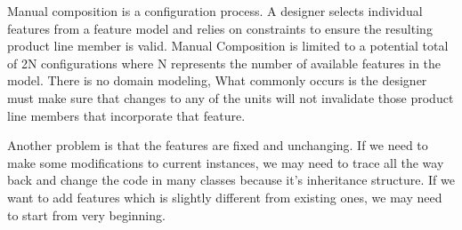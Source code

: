 Manual composition is a configuration process. A designer selects
individual features from a feature model and relies on constraints to
ensure the resulting product line member is valid. Manual Composition is
limited to a potential total of 2N configurations where N represents the
number of available features in the model. There is no domain modeling,
What commonly occurs is the designer must make sure that changes to any
of the units will not invalidate those product line members that
incorporate that feature.

Another problem is that the features are fixed and unchanging. If we
need to make some modifications to current instances, we may need to
trace all the way back and change the code in many classes because it’s
inheritance structure. If we want to add features which is slightly
different from existing ones, we may need to start from very beginning.
